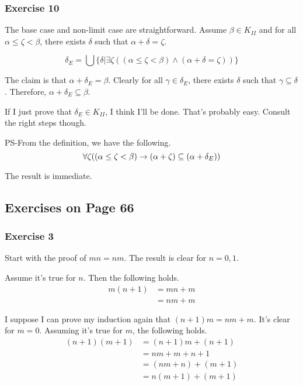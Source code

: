 \documentclass{article}
\begin{document}
\subsubsection{Exercise 10}
The base case and non-limit case are straightforward. Assume \(\beta \in
K_{II}\) and for all \(\alpha \le \zeta < \beta\), there exists \(\delta\) such
that \(\alpha + \delta = \zeta\).

\[
  \delta_E = \bigcup \{\delta \vert \exists \zeta ((\alpha \le \zeta < \beta)
      \wedge (\alpha + \delta = \zeta))\}
\]

The claim is that \(\alpha + \delta_E = \beta\). Clearly for all \(\gamma \in
\delta_E\), there exists \(\delta\) such that \(\gamma \subseteq \delta\).
Therefore, \(\alpha + \delta_E \subseteq \beta\).

If I just prove that \(\delta_E \in K_{II}\), I think I'll be done. That's
probably easy. Consult the right steps though.

PS-From the definition, we have the following.
\[
  \forall \zeta ((\alpha \le \zeta < \beta) \rightarrow \\
      (\alpha + \zeta) \subseteq (\alpha + \delta_E))
\]

The result is immediate.

\subsection{Exercises on Page 66}
\subsubsection{Exercise 3}

Start with the proof of \(mn = nm\). The result is clear for \(n=0,1\).

Assume it's true for \(n\). Then the following holds.
\begin{align*}
  m(n + 1) &= mn + m \\
    &= nm + m
\end{align*}

I suppose I can prove my induction again that \((n+1)m = nm + m\). It's clear for
\(m = 0\). Assuming it's true for \(m\), the following holds.
\begin{align*}
  (n + 1)(m + 1) &= (n + 1)m + (n + 1) \\
    &= nm + m + n + 1 \\
    &= (nm + n) + (m + 1) \\
    &= n(m + 1) + (m + 1)
\end{align*}
\end{document}
